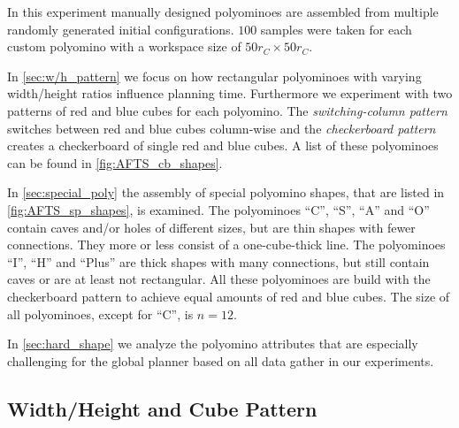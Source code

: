 
In this experiment manually designed polyominoes are assembled from multiple randomly generated initial configurations.
$100$ samples were taken for each custom polyomino with a workspace size of $50 r_C \times 50 r_C$.

In \autoref{sec:w/h_pattern} we focus on how rectangular polyominoes with varying width/height ratios influence planning time.
Furthermore we experiment with two patterns of red and blue cubes for each polyomino.
The \textit{switching-column pattern} switches between red and blue cubes column-wise and the \textit{checkerboard pattern} creates a checkerboard of single red and blue cubes.
A list of these polyominoes can be found in \autoref{fig:AFTS_cb_shapes}.

In \autoref{sec:special_poly} the assembly of special polyomino shapes, that are listed in \autoref{fig:AFTS_sp_shapes}, is examined. 
The polyominoes ``C'', ``S'', ``A'' and ``O'' contain caves and/or holes of different sizes, but are thin shapes with fewer connections.
They more or less consist of a one-cube-thick line.
The polyominoes ``I'', ``H'' and ``Plus'' are thick shapes with many connections, but still contain caves or are at least not rectangular.
All these polyominoes are build with the checkerboard pattern to achieve equal amounts of red and blue cubes.
The size of all polyominoes, except for ``C'', is $n=12$.
 
In \autoref{sec:hard_shape} we analyze the polyomino attributes that are especially challenging for the global planner based on all data gather in our experiments.

\subsection{Width/Height and Cube Pattern}
\label{sec:w/h_pattern}

